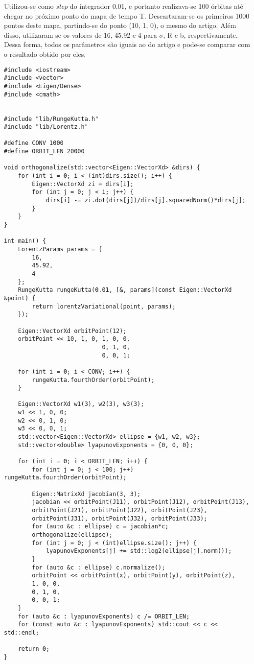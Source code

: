 \documentclass{article}[twocolumn]
\begin{document}
	Utilizou-se como \textit{step} do integrador 0.01, e portanto realizava-se 100 \'orbitas
	at\'e chegar no pr\'oximo ponto do mapa de tempo T. Descartaram-se os primeiros 1000 pontos
	deste mapa, partindo-se do ponto (10, 1, 0), o mesmo do artigo. Al\'em disso, utilizaram-se
	os valores de 16, 45.92 e 4 para $\sigma$, R e b, respectivamente. Dessa forma, todos os
	par\^ametros s\~ao iguais ao do artigo e pode-se comparar com o resultado obtido por eles.
	\begin{verbatim}
#include <iostream>
#include <vector>
#include <Eigen/Dense>
#include <cmath>


#include "lib/RungeKutta.h"
#include "lib/Lorentz.h"

#define CONV 1000
#define ORBIT_LEN 20000

void orthogonalize(std::vector<Eigen::VectorXd> &dirs) {
    for (int i = 0; i < (int)dirs.size(); i++) {
        Eigen::VectorXd zi = dirs[i];
        for (int j = 0; j < i; j++) {
            dirs[i] -= zi.dot(dirs[j])/dirs[j].squaredNorm()*dirs[j];
        }
    }
}

int main() {
    LorentzParams params = {
        16,
        45.92,
        4
    };
    RungeKutta rungeKutta(0.01, [&, params](const Eigen::VectorXd &point) {
        return lorentzVariational(point, params);
    });
    
    Eigen::VectorXd orbitPoint(12);
    orbitPoint << 10, 1, 0, 1, 0, 0,
                            0, 1, 0,
                            0, 0, 1;
    	
    for (int i = 0; i < CONV; i++) {
        rungeKutta.fourthOrder(orbitPoint);
    }
    
    Eigen::VectorXd w1(3), w2(3), w3(3);
    w1 << 1, 0, 0;
    w2 << 0, 1, 0;
    w3 << 0, 0, 1;
    std::vector<Eigen::VectorXd> ellipse = {w1, w2, w3};
    std::vector<double> lyapunovExponents = {0, 0, 0};
    
    for (int i = 0; i < ORBIT_LEN; i++) {
        for (int j = 0; j < 100; j++) rungeKutta.fourthOrder(orbitPoint);
        
        Eigen::MatrixXd jacobian(3, 3);
        jacobian << orbitPoint(J11), orbitPoint(J12), orbitPoint(J13),
        orbitPoint(J21), orbitPoint(J22), orbitPoint(J23),
        orbitPoint(J31), orbitPoint(J32), orbitPoint(J33);
        for (auto &c : ellipse) c = jacobian*c;
        orthogonalize(ellipse);
        for (int j = 0; j < (int)ellipse.size(); j++) {
            lyapunovExponents[j] += std::log2(ellipse[j].norm());
        }
        for (auto &c : ellipse) c.normalize();
        orbitPoint << orbitPoint(x), orbitPoint(y), orbitPoint(z),
        1, 0, 0,
        0, 1, 0,
        0, 0, 1;
    }
    for (auto &c : lyapunovExponents) c /= ORBIT_LEN;
    for (const auto &c : lyapunovExponents) std::cout << c << std::endl;
    
    return 0;
}

	\end{verbatim}
\end{document}
